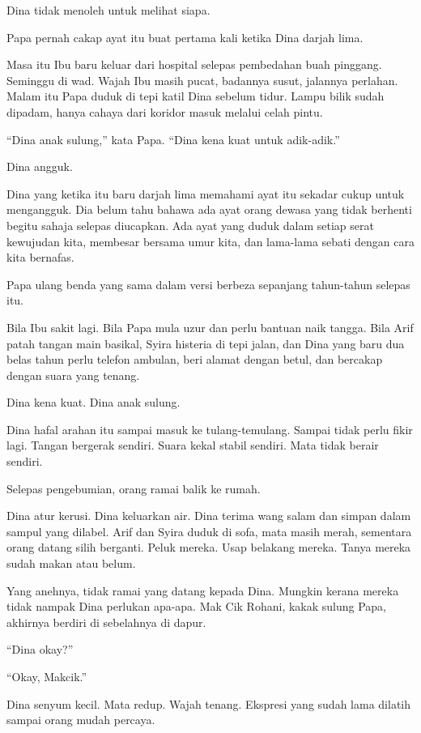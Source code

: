 \documentclass[
  11pt,
  a5paper,
  openany,
  oneside]{book}
\begin{document}
Dina tidak menoleh untuk melihat siapa.

Papa pernah cakap ayat itu buat pertama kali ketika Dina darjah lima.

Masa itu Ibu baru keluar dari hospital selepas pembedahan buah pinggang.
Seminggu di wad. Wajah Ibu masih pucat, badannya susut, jalannya
perlahan. Malam itu Papa duduk di tepi katil Dina sebelum tidur. Lampu
bilik sudah dipadam, hanya cahaya dari koridor masuk melalui celah
pintu.

``Dina anak sulung,'' kata Papa. ``Dina kena kuat untuk adik-adik.''

Dina angguk.

Dina yang ketika itu baru darjah lima memahami ayat itu sekadar cukup
untuk mengangguk. Dia belum tahu bahawa ada ayat orang dewasa yang tidak
berhenti begitu sahaja selepas diucapkan. Ada ayat yang duduk dalam
setiap serat kewujudan kita, membesar bersama umur kita, dan lama-lama
sebati dengan cara kita bernafas.

Papa ulang benda yang sama dalam versi berbeza sepanjang tahun-tahun
selepas itu.

Bila Ibu sakit lagi. Bila Papa mula uzur dan perlu bantuan naik tangga.
Bila Arif patah tangan main basikal, Syira histeria di tepi jalan, dan
Dina yang baru dua belas tahun perlu telefon ambulan, beri alamat dengan
betul, dan bercakap dengan suara yang tenang.

Dina kena kuat. Dina anak sulung.

Dina hafal arahan itu sampai masuk ke tulang-temulang. Sampai tidak
perlu fikir lagi. Tangan bergerak sendiri. Suara kekal stabil sendiri.
Mata tidak berair sendiri.

Selepas pengebumian, orang ramai balik ke rumah.

Dina atur kerusi. Dina keluarkan air. Dina terima wang salam dan simpan
dalam sampul yang dilabel. Arif dan Syira duduk di sofa, mata masih
merah, sementara orang datang silih berganti. Peluk mereka. Usap
belakang mereka. Tanya mereka sudah makan atau belum.

Yang anehnya, tidak ramai yang datang kepada Dina. Mungkin kerana mereka
tidak nampak Dina perlukan apa-apa. Mak Cik Rohani, kakak sulung Papa,
akhirnya berdiri di sebelahnya di dapur.

``Dina okay?''

``Okay, Makcik.''

Dina senyum kecil. Mata redup. Wajah tenang. Ekspresi yang sudah lama
dilatih sampai orang mudah percaya.
\end{document}
